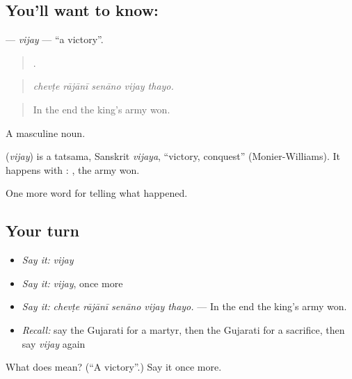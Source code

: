 \subsection*{You'll want to know: }
\textbf{} — \emph{vijay} — \textquotedblleft{}a victory\textquotedblright{}.

\begin{quote}
    .
\end{quote}

\begin{quote}
\emph{chevṭe rājānī senāno vijay thayo.}
\end{quote}

\begin{quote}
In the end the king's army won.
\end{quote}

A masculine noun.

\begin{cousinweb}
\textbf{} (\emph{vijay}) is a tatsama, Sanskrit \emph{vijaya}, \textquotedblleft{}victory, conquest\textquotedblright{} (Monier-Williams). It happens with \textbf{}: \textbf{  }, the army won.
\end{cousinweb}

\begin{grammarlens}[title={What you've built}]
One more word for telling what happened.
\end{grammarlens}

\subsection*{Your turn}
\begin{itemize}
\raggedright
  \item \emph{Say it:} \emph{vijay}
  \item \emph{Say it:} \emph{vijay}, once more
  \item \emph{Say it:} \emph{chevṭe rājānī senāno vijay thayo.} — In the end the king's army won.
  \item \emph{Recall:} say the Gujarati for a martyr, then the Gujarati for a sacrifice, then say \emph{vijay} again
\end{itemize}

\begin{tcolorbox}[breakable,colback=teal!4,colframe=teal!35!black,title={Before you move on}]
What does  mean? (\textquotedblleft{}A victory\textquotedblright{}.) Say it once more.
\end{tcolorbox}
